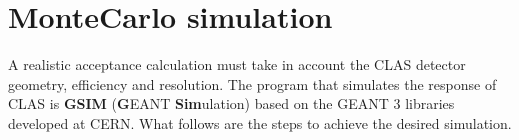 \cia\vspace{-2cm}
\section{MonteCarlo simulation}
A realistic acceptance calculation must take in account the CLAS detector 
geometry, efficiency and resolution.
The program that simulates the response of CLAS is {\bf GSIM} ({\bf G}EANT {\bf Sim}ulation)
based on the GEANT 3 libraries developed at CERN.
What follows
are the steps to achieve the desired simulation.
